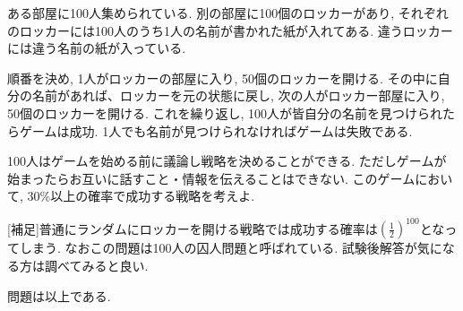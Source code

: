 \documentclass[dvipdfmx,a4paper,11pt]{article}
\theoremstyle{definition}
\begin{document}
  ある部屋に100人集められている. 別の部屋に100個のロッカーがあり, それぞれのロッカーには100人のうち1人の名前が書かれた紙が入れてある. 違うロッカーには違う名前の紙が入っている.

順番を決め, 1人がロッカーの部屋に入り, 50個のロッカーを開ける.
その中に自分の名前があれば、ロッカーを元の状態に戻し, 次の人がロッカー部屋に入り, 50個のロッカーを開ける.
これを繰り返し, 100人が皆自分の名前を見つけられたらゲームは成功. 1人でも名前が見つけられなければゲームは失敗である.

100人はゲームを始める前に議論し戦略を決めることができる. ただしゲームが始まったらお互いに話すこと・情報を伝えることはできない.  このゲームにおいて, 30\%以上の確率で成功する戦略を考えよ.

\vspace{5pt}
[補足]普通にランダムにロッカーを開ける戦略では成功する確率は$(\frac{1}{2})^{100}$となってしまう. 
なおこの問題は100人の囚人問題と呼ばれている. 試験後解答が気になる方は調べてみると良い. 

\begin{flushright}
\LARGE{問題は以上である. }
\end{flushright}
 
\end{document}
